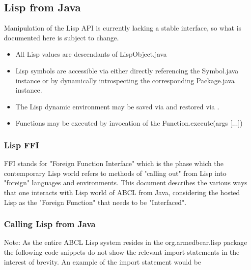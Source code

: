 \subsection{Lisp from Java}

Manipulation of the Lisp API is currently lacking a stable interface,
so what is documented here is subject to change.  

\begin{itemize}
\item All Lisp values are descendants of LispObject.java
\item Lisp symbols are accessible via either directly referencing the
  Symbol.java instance or by dynamically introspecting the
  corresponding Package.java instance.
\item The Lisp dynamic environment may be saved via
   and restored via
  .
\item Functions may be executed by invocation of the
  Function.execute(args [...]) 
\end{itemize}

\subsubsection{Lisp FFI}

FFI stands for "Foreign Function Interface" which is the phase which
the contemporary Lisp world refers to methods of "calling out" from
Lisp into "foreign" languages and environments.  This document
describes the various ways that one interacts with Lisp world of ABCL
from Java, considering the hosted Lisp as the "Foreign Function" that
needs to be "Interfaced".

\subsubsection{Calling Lisp from Java}

Note: As the entire ABCL Lisp system resides in the org.armedbear.lisp
package the following code snippets do not show the relevant import
statements in the interest of brevity.  An example of the import
statement would be

